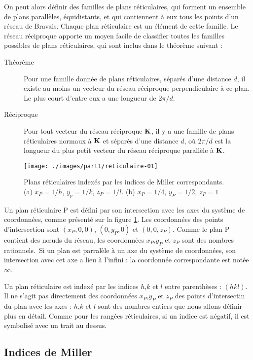On peut alors définir des familles de plans réticulaires, qui forment un ensemble de plans parallèles, équidistants, et qui contiennent à eux tous les points d'un réseau de Bravais. Chaque plan réticulaire est un élément de cette famille. Le réseau réciproque apporte un moyen facile de classifier toutes les familles possibles de plans réticulaires, qui sont inclus dans le théorème suivant :

\begin{description}
    \item[Théorème] Pour une famille donnée de plans réticulaires, séparés d'une distance $d$, il existe au moins un vecteur du réseau réciproque perpendiculaire à ce plan. Le plus court d'entre eux a une longueur de $2\pi/d$.
    \item[Réciproque] Pour tout vecteur du réseau réciproque $\mathbf{K}$, il y a une famille de plans réticulaires normaux à $\mathbf{K}$ et séparés d'une distance $d$, où $2\pi/d$ est la longueur du plus petit vecteur du réseau réciproque parallèle à $\mathbf{K}$.
\end{description}

\begin{figure}
    \texttt{[image: ./images/part1/reticulaire-01]}
    \caption{Plans réticulaires indexés par les indices de Miller correspondants. (a) $x_P = 1/h$, $y_p = 1/k$, $z_P = 1/l$. (b) $x_P = 1/4$, $y_P = 1/2$, $z_P = 1$}
    \label{fig:retic}
\end{figure}

Un plan réticulaire P est défini par son intersection avec les axes du système de coordonnées, comme présenté sur la figure \ref{fig:retic}. Les coordonnées des points d'intersection sont $(x_P,0,0)$, $(0,y_P,0)$ et $(0,0,z_P)$. Comme le plan P contient des nœuds du réseau, les coordonnées $x_P$,$y_P$ et $z_P$ sont des nombres rationnels. Si un plan est parralèle à un axe du système de coordonnées, son intersection avec cet axe a lieu à l'infini : la coordonnée correspondante est notée $\infty$.

Un plan réticulaire est indexé par les indices $h$,$k$ et $l$ entre parenthèses : $(hkl)$. Il ne s'agit pas directement des coordonnées $x_P$,$y_P$ et $z_P$ des points d'intersectin du plan avec les axes : $h$,$k$ et $l$ sont des nombres entiers que nous allons définir plus en détail. Comme pour les rangées réticulaires, si un indice est négatif, il est symbolisé avec un trait au dessus.

\subsection{Indices de Miller}

